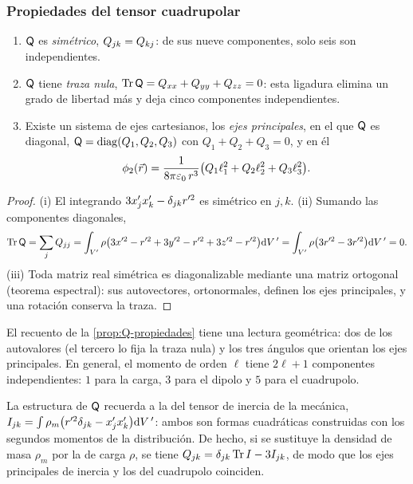 \subsubsection*{Propiedades del tensor cuadrupolar}
\begin{proposicion}\label{prop:Q-propiedades}
\begin{enumerate}[label=(\roman*)]
  \item $\mathsf{Q}$ es \emph{simétrico}, $Q_{jk}=Q_{kj}$: de sus nueve componentes, solo seis son independientes.
  \item $\mathsf{Q}$ tiene \emph{traza nula}, $\operatorname{Tr}\mathsf{Q}=Q_{xx}+Q_{yy}+Q_{zz}=0$: esta ligadura elimina un grado de libertad más y deja cinco componentes independientes.
  \item Existe un sistema de ejes cartesianos, los \emph{ejes principales}, en el que $\mathsf{Q}$ es diagonal, $\mathsf{Q}=\operatorname{diag}(Q_1,Q_2,Q_3)$ con
        $Q_1+Q_2+Q_3=0$, y en él
        \begin{equation}\label{eq:Q-principal}
          \phi_{2}(\vec{r})=\frac{1}{8\pi\varepsilon_{0}\,r^{3}}\bigl(Q_1\ell_{1}^{2}+Q_2\ell_{2}^{2}+Q_3\ell_{3}^{2}\bigr).
        \end{equation}
\end{enumerate}
\end{proposicion}
\begin{proof}
(i) El integrando $3x'_jx'_k-\delta_{jk}r'^{2}$ es simétrico en $j,k$. (ii) Sumando las componentes diagonales,
\[
  \operatorname{Tr}\mathsf{Q}=\sum_{j}Q_{jj}=\int_{V'}\rho\bigl(3x'^{2}-r'^{2}+3y'^{2}-r'^{2}+3z'^{2}-r'^{2}\bigr)\mathrm{d} V\,'=\int_{V'}\rho\bigl(3r'^{2}-3r'^{2}\bigr)\mathrm{d} V\,'=0 .
\]
(iii) Toda matriz real simétrica es diagonalizable mediante una matriz ortogonal (teorema espectral): sus autovectores, ortonormales, definen los ejes
principales, y una rotación conserva la traza.
\end{proof}

\begin{observacion}\label{obs:cinco}
El recuento de la \cref{prop:Q-propiedades} tiene una lectura geométrica: dos de los autovalores (el tercero lo fija la traza nula) y los tres ángulos que orientan los
ejes principales. En general, el momento de orden $\ell$ tiene $2\ell+1$ componentes independientes: $1$ para la carga, $3$ para el dipolo y $5$ para el
cuadrupolo.
\end{observacion}

\begin{observacion}\label{obs:inercia}
La estructura de $\mathsf{Q}$ recuerda a la del tensor de inercia de la mecánica, $I_{jk}=\int\rho_m\bigl(r'^{2}\delta_{jk}-x'_jx'_k\bigr)\mathrm{d} V\,'$: ambos son formas cuadráticas
construidas con los segundos momentos de la distribución. De hecho, si se sustituye la densidad de masa $\rho_m$ por la de carga $\rho$, se tiene
$Q_{jk}=\delta_{jk}\operatorname{Tr} I-3I_{jk}$, de modo que los ejes principales de inercia y los del cuadrupolo coinciden.
\end{observacion}

